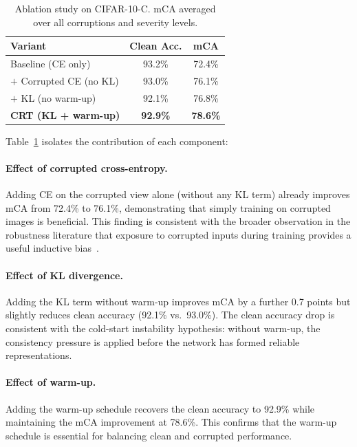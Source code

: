 \documentclass[10pt,twocolumn]{article}
\begin{document}
\begin{table}[t]
\centering
\caption{Ablation study on CIFAR-10-C. mCA averaged over all corruptions and severity levels.}
\label{tab:ablation}
\begin{tabular}{lcc}
\toprule
\textbf{Variant} & \textbf{Clean Acc.} & \textbf{mCA} \\
\midrule
Baseline (CE only)              & 93.2\%              & 72.4\%       \\
$+$ Corrupted CE (no KL)        & 93.0\%              & 76.1\%       \\
$+$ KL (no warm-up)             & 92.1\%              & 76.8\%       \\
\textbf{CRT (KL + warm-up)}     & \textbf{92.9\%}     & \textbf{78.6\%} \\
\bottomrule
\end{tabular}
\end{table}

Table~\ref{tab:ablation} isolates the contribution of each component:

\paragraph{Effect of corrupted cross-entropy.} Adding CE on the corrupted view alone (without any KL term) already improves mCA from 72.4\% to 76.1\%, demonstrating that simply training on corrupted images is beneficial. This finding is consistent with the broader observation in the robustness literature that exposure to corrupted inputs during training provides a useful inductive bias~\cite{erichson2024noisymix,kumar2026demhec}.

\paragraph{Effect of KL divergence.} Adding the KL term without warm-up improves mCA by a further 0.7 points but slightly reduces clean accuracy (92.1\% vs.\ 93.0\%). The clean accuracy drop is consistent with the cold-start instability hypothesis: without warm-up, the consistency pressure is applied before the network has formed reliable representations.

\paragraph{Effect of warm-up.} Adding the warm-up schedule recovers the clean accuracy to 92.9\% while maintaining the mCA improvement at 78.6\%. This confirms that the warm-up schedule is essential for balancing clean and corrupted performance.
\end{document}
